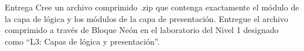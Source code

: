 \documentclass{ip-lab}
\begin{document}
\pagebreak

\begin{sectionbox}{Entrega}
  Cree un archivo comprimido .zip que contenga exactamente el módulo de la capa de lógica y los módulos de la capa de presentación. Entregue el archivo comprimido a través de Bloque Neón en el laboratorio del Nivel 1 designado como ``L3: Capas de lógica y presentación''.
\end{sectionbox}
\end{document}
